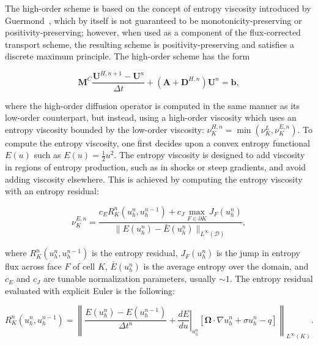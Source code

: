 The high-order scheme is based on the concept of entropy
viscosity introduced by Guermond~\cite{guermond_ev}, which by itself
is not guaranteed to be monotonicity-preserving or positivity-preserving;
however, when used as a component of the flux-corrected transport scheme,
the resulting scheme is positivity-preserving
and satisfies a discrete maximum principle.
The high-order scheme has the form

\begin{equation}\label{eq:highorderscheme}
   \mathbf{M}^C\frac{\mathbf{U}^{H,n+1}-\mathbf{U}^n}{\Delta t}
      +\left(\mathbf{A}+\mathbf{D}^{H,n}\right)\mathbf{U}^n = \mathbf{b},
\end{equation}

where the high-order diffusion operator is computed in the same manner
as its low-order counterpart, but instead, using a high-order viscosity
which uses an entropy viscosity bounded by the low-order viscosity:
$\nu^{H,n}_K = \min(\nu^{L}_K,\nu^{E,n}_K)$. To compute the entropy
viscosity, 
one first decides upon a convex entropy functional $E(u)$ such as $E(u)=\frac{1}{2}u^2$.
The entropy viscosity is designed to add viscosity in regions of entropy
production, such as in shocks or steep gradients, and avoid adding
viscosity elsewhere. This is achieved by computing the entropy viscosity
with an entropy residual:

\begin{equation}
   \nu^{E,n}_K = \frac{c_E R_K^n(u_h^n,u_h^{n-1})
      + c_J\max\limits_{F\in\partial K}J_F(u_h^n)}
      {\|E(u_h^n)-\bar{E}(u_h^n)\|_{L^\infty(\mathcal{D})}},
\end{equation}

where $R_K^n(u_h^n,u_h^{n-1})$ is the entropy residual, $J_F(u_h^n)$
is the jump in entropy flux across face $F$ of cell $K$, $\bar{E}(u_h^n)$ is the average
entropy over the domain, and $c_E$ and $c_J$ are tunable normalization
parameters, usually $\sim 1$.
The entropy residual evaluated with explicit Euler is the following:

\begin{equation}
    R_K^n(u_h^n,u_h^{n-1}) = \left\|\frac{E(u_h^n)-E(u_h^{n-1})}{\Delta t^n}
      + \left.\frac{dE}{du}\right|_{u_h^n}\left[\mathbf{\Omega}\cdot\nabla u_h^n
      + \sigma u_h^n
      - q \right]\right\|_{L^\infty(K)}.
\end{equation}
